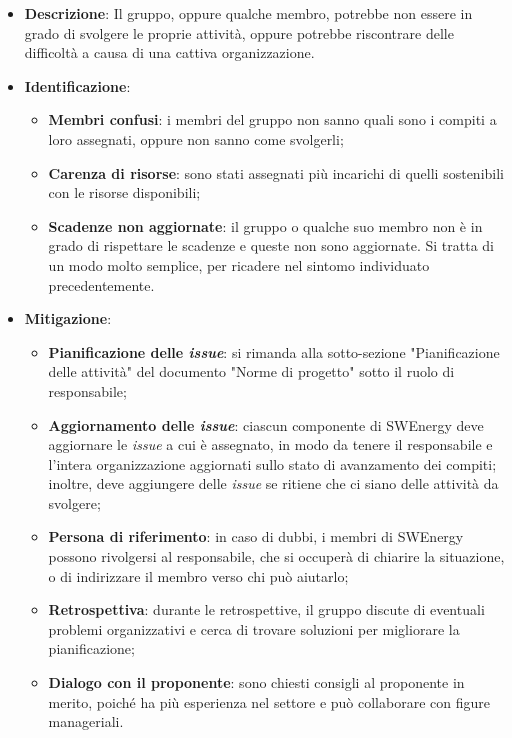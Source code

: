 \label{risk:organizzazione carente}
\begin{itemize}
	\item \textbf{Descrizione}:
	      Il gruppo, oppure qualche membro, potrebbe non essere in grado di
	      svolgere le proprie attività, oppure potrebbe riscontrare delle
	      difficoltà a causa di una cattiva organizzazione.
	\item \textbf{Identificazione}:
	      \begin{itemize}
		      \item \textbf{Membri confusi}: i membri del gruppo non sanno quali
		            sono i compiti a loro assegnati, oppure non sanno come
		            svolgerli;

		      \item \textbf{Carenza di risorse}: sono stati assegnati più
		            incarichi di quelli sostenibili con le risorse disponibili;

		      \item \textbf{Scadenze non aggiornate}: il gruppo o qualche suo
		            membro non è in grado di rispettare le scadenze e queste non
		            sono aggiornate. Si tratta di un modo molto semplice, per
		            ricadere nel sintomo individuato precedentemente.
	      \end{itemize}

	\item \textbf{Mitigazione}:
	      \begin{itemize}
		      \item \textbf{Pianificazione delle \textit{issue}\g}: si rimanda
		            alla sotto-sezione "Pianificazione delle attività" del
		            documento "Norme di progetto" sotto il ruolo di
		            responsabile;

		      \item \textbf{Aggiornamento delle \textit{issue}}:
		            ciascun componente di SWEnergy deve aggiornare le
		            \textit{issue} a cui è assegnato, in modo da tenere il
		            responsabile e l'intera organizzazione aggiornati sullo
		            stato di avanzamento dei compiti; inoltre, deve aggiungere
		            delle \textit{issue} se ritiene che ci siano delle attività
		            da svolgere;

		      \item \textbf{Persona di riferimento}: in caso di dubbi, i
		            membri di SWEnergy possono rivolgersi
		            al responsabile, che si occuperà di chiarire la situazione,
		            o di indirizzare il membro verso chi può aiutarlo;

		      \item \textbf{Retrospettiva}: durante le retrospettive, il gruppo
		            discute di eventuali problemi organizzativi e cerca di
		            trovare soluzioni per migliorare la pianificazione;

		      \item \textbf{Dialogo con il proponente}: sono chiesti consigli al
		            proponente in merito, poiché ha più esperienza nel settore e 
					può collaborare con figure manageriali.
	      \end{itemize}
\end{itemize}
